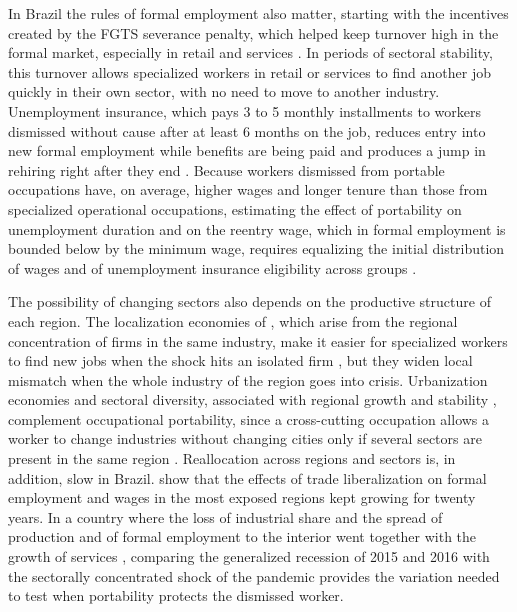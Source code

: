 \documentclass[11pt,a4paper]{article}
\let\citetorig\citet
\let\citeporig\citep
\renewcommand{\citet}[1]{{\color{citeblue}\citetorig{#1}}}
\renewcommand{\citep}[1]{{\color{citeblue}\citeporig{#1}}}
\begin{document}
In Brazil the rules of formal employment also matter, starting with the incentives created by the FGTS severance penalty, which helped keep turnover high in the formal market, especially in retail and services \citep{barros2000, gonzaga2003, ponczek2022}. In periods of sectoral stability, this turnover allows specialized workers in retail or services to find another job quickly in their own sector, with no need to move to another industry. Unemployment insurance, which pays 3 to 5 monthly installments to workers dismissed without cause after at least 6 months on the job, reduces entry into new formal employment while benefits are being paid and produces a jump in rehiring right after they end \citep{gerard2021}. Because workers dismissed from portable occupations have, on average, higher wages and longer tenure than those from specialized operational occupations, estimating the effect of portability on unemployment duration and on the reentry wage, which in formal employment is bounded below by the minimum wage, requires equalizing the initial distribution of wages and of unemployment insurance eligibility across groups \citep{dfl1996}.

The possibility of changing sectors also depends on the productive structure of each region. The localization economies of \citet{marshall1890}, which arise from the regional concentration of firms in the same industry, make it easier for specialized workers to find new jobs when the shock hits an isolated firm \citep{figueiredo2009}, but they widen local mismatch when the whole industry of the region goes into crisis. Urbanization economies and sectoral diversity, associated with regional growth and stability \citep{frenken2007, ellison2010}, complement occupational portability, since a cross-cutting occupation allows a worker to change industries without changing cities only if several sectors are present in the same region \citep{jarafigueroa2018}. Reallocation across regions and sectors is, in addition, slow in Brazil. \citet{dixcarneiro2017} show that the effects of trade liberalization on formal employment and wages in the most exposed regions kept growing for twenty years. In a country where the loss of industrial share \citep{rodrik2016} and the spread of production and of formal employment to the interior \citep{saboia2013, macedo2021} went together with the growth of services \citep{jacinto2015}, comparing the generalized recession of 2015 and 2016 with the sectorally concentrated shock of the pandemic \citep{corseuil2020} provides the variation needed to test when portability protects the dismissed worker.
\end{document}
